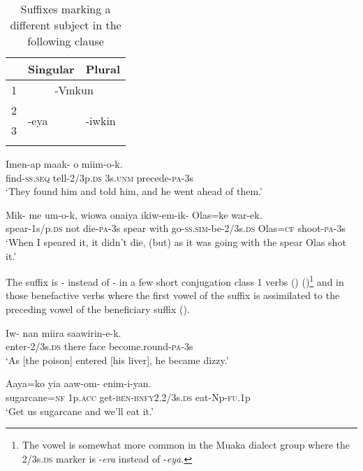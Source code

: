\begin{table}\begin{tabular}{lll}
\mytoprule
 & Singular & Plural\\
\midrule 
1 & \multicolumn{2}{c}{-Vmkun}\\
2 & \multirow{2}{*}{-eya} & \multirow{2}{*}{-iwkin}\\
3 & & \\ 
\mybottomrule
\end{tabular}
\caption{Suffixes marking a different subject in the following clause}
\label{tab:14}
\end{table}

\ea%
\label{ex:x244}
\gll Imen-ap maak- o miim-o-k. \\
find-\textsc{ss}.\textsc{seq} tell-2/3p.\textsc{ds} 3s.\textsc{unm} precede-\textsc{pa}-3s \\
\glt`They found him and told him, and he went ahead of them.' 
\z

\ea%
\label{ex:x245}
\gll Mik- me um-o-k, wiowa onaiya ikiw-em-ik- Olas=ke war-ek.\\
spear-1s/p.\textsc{ds} not die-\textsc{pa}-3s spear with go-\textsc{ss}.\textsc{sim}-be-2/3s.\textsc{ds} Olas=\textsc{cf} shoot-\textsc{pa}-3s\\
\glt`When I speared it, it didn't die, (but) as it was going with the spear Olas shot it.'
\z

The suffix is - instead of \nobreakdash- in a few short conjugation class 1 verbs () ()\footnote{The vowel  is somewhat more common in the Muaka dialect group where the 2/3s.\textsc{ds} marker is -\textit{era} instead of \nobreakdash-\textit{eya.}} and in those benefactive verbs where the first vowel of the suffix is assimilated to the preceding vowel of the beneficiary suffix (). 

\ea%
\label{ex:x493}
\gll Iw- nan miira saawirin-e-k. \\
enter-2/3s.\textsc{ds} there face become.round-\textsc{pa}-3s\\
\glt`As [the poison] entered [his liver], he became dizzy.'
\z

\ea%
\label{ex:x695}
\gll Aaya=ko yia aaw-om- enim-i-yan. \\
sugarcane=\textsc{nf} 1p.\textsc{acc} get-\textsc{ben}-\textsc{bnfy}2.2/3s.\textsc{ds} eat-Np-\textsc{fu}.1p\\
\glt`Get us sugarcane and we'll eat it.'
\z

